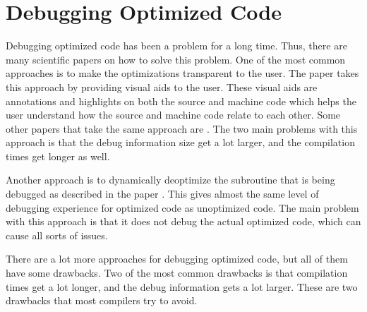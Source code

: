 
\section{Debugging Optimized Code}


Debugging optimized code has been a problem for a long time.
Thus, there are many scientific papers on how to solve this problem.
One of the most common approaches is to make the optimizations transparent to the user.
The paper \cite{edselc.2-52.0-8497669319919920107} takes this approach by providing visual aids to the user.
These visual aids are annotations and highlights on both the source and machine code which helps the user understand how the source and machine code relate to each other.
Some other papers that take the same approach are \cite{adl1996source, edselc.2-52.0-002842706219940105}.
The two main problems with this approach is that the debug information size get a lot larger, and the compilation times get longer as well.


Another approach is to dynamically deoptimize the subroutine that is being debugged as described in the paper \cite{edselc.2-52.0-002699386519920107}.
This gives almost the same level of debugging experience for optimized code as unoptimized code.
The main problem with this approach is that it does not debug the actual optimized code, which can cause all sorts of issues.


There are a lot more approaches for debugging optimized code, but all of them have some drawbacks.
Two of the most common drawbacks is that compilation times get a lot longer, and the debug information gets a lot larger.
These are two drawbacks that most compilers try to avoid.



